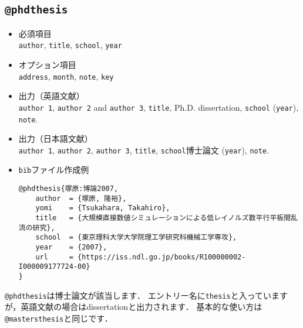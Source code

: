 \documentclass[a4paper,fleqn,uplatex,dvipdfmx]{jsarticle}
\makeatletter
\newcommand{\ttmastersthesis}{\texttt{@mastersthesis}}
\newcommand{\ttphdthesis}{\texttt{@phdthesis}}
\makeatother
\begin{document}
\subsection{\ttphdthesis}
\label{ssec:phdthesis}
\begin{screen}
    \begin{itemize}
        \item 必須項目 \\
        \verb|author|, \verb|title|, \verb|school|, \verb|year|
        \item オプション項目 \\
        \verb|address|, \verb|month|, \verb|note|, \verb|key|
        \item 出力（英語文献） \\
            \colorbox[gray]{0.8}{\texttt{author 1}}, \colorbox[gray]{0.8}{\texttt{author 2}} and \colorbox[gray]{0.8}{\texttt{author 3}}, \colorbox[gray]{0.8}{\texttt{title}}, Ph.D. dissertation, \colorbox[gray]{0.8}{\texttt{school}} (\colorbox[gray]{0.8}{\texttt{year}}), \colorbox[gray]{0.8}{\texttt{note}}.
        \item 出力（日本語文献） \\
            \colorbox[gray]{0.8}{\texttt{author 1}}, \colorbox[gray]{0.8}{\texttt{author 2}}, \colorbox[gray]{0.8}{\texttt{author 3}}, \colorbox[gray]{0.8}{\texttt{title}}, \colorbox[gray]{0.8}{\texttt{school}}博士論文 (\colorbox[gray]{0.8}{\texttt{year}}), \colorbox[gray]{0.8}{\texttt{note}}.
        \item \verb|bib|ファイル作成例 \vspace{-3mm}
\begin{verbatim}
@phdthesis{塚原:博論2007,
    author  = {塚原, 隆裕},
    yomi    = {Tsukahara, Takahiro},
    title   = {大規模直接数値シミュレーションによる低レイノルズ数平行平板間乱流の研究},
    school  = {東京理科大学大学院理工学研究科機械工学専攻},
    year    = {2007},
    url     = {https://iss.ndl.go.jp/books/R100000002-I000009177724-00}
}
\end{verbatim}
    \end{itemize}
\end{screen}

\ttphdthesis は博士論文が該当します．
エントリー名に\verb|thesis|と入っていますが，英語文献の場合はdissertationと出力されます．
基本的な使い方は\ttmastersthesis と同じです．
\end{document}
